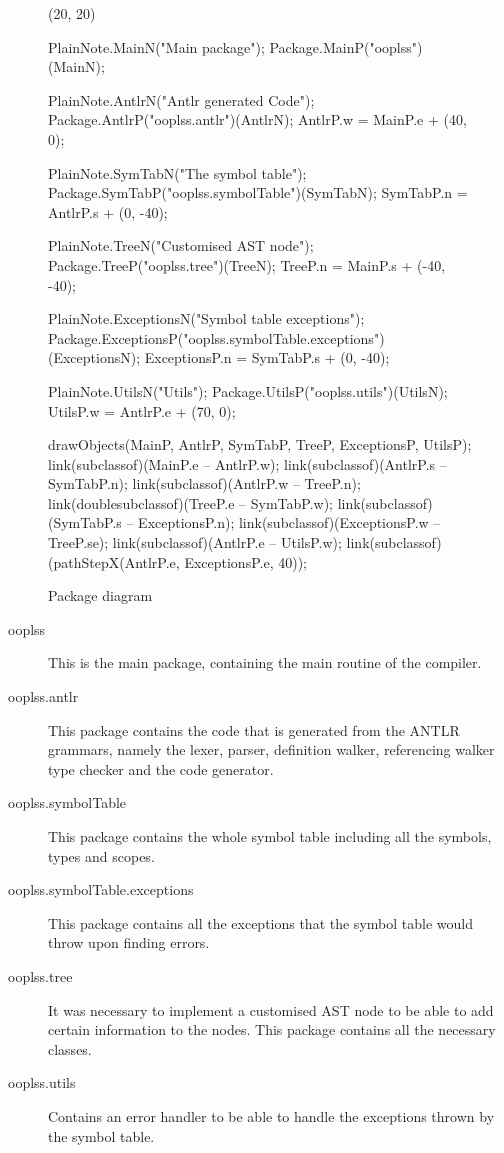 \begin{figure}[H]
\centering
	\begin{emp}[classdiag](20, 20)

	PlainNote.MainN("Main package");
	Package.MainP("ooplss")(MainN);

	PlainNote.AntlrN("Antlr generated Code");
	Package.AntlrP("ooplss.antlr")(AntlrN);
	AntlrP.w = MainP.e + (40, 0);

	PlainNote.SymTabN("The symbol table");
	Package.SymTabP("ooplss.symbolTable")(SymTabN);
	SymTabP.n = AntlrP.s + (0, -40);

	PlainNote.TreeN("Customised AST node");
	Package.TreeP("ooplss.tree")(TreeN);
	TreeP.n = MainP.s + (-40, -40);

	PlainNote.ExceptionsN("Symbol table exceptions");
	Package.ExceptionsP("ooplss.symbolTable.exceptions")(ExceptionsN);
	ExceptionsP.n = SymTabP.s + (0, -40);

	PlainNote.UtilsN("Utils");
	Package.UtilsP("ooplss.utils")(UtilsN);
	UtilsP.w = AntlrP.e + (70, 0);

	drawObjects(MainP, AntlrP, SymTabP, TreeP, ExceptionsP, UtilsP);
	link(subclassof)(MainP.e -- AntlrP.w);
	link(subclassof)(AntlrP.s -- SymTabP.n);
	link(subclassof)(AntlrP.w -- TreeP.n);
	link(doublesubclassof)(TreeP.e -- SymTabP.w);
	link(subclassof)(SymTabP.s -- ExceptionsP.n);
	link(subclassof)(ExceptionsP.w -- TreeP.se);
	link(subclassof)(AntlrP.e -- UtilsP.w);
	link(subclassof)(pathStepX(AntlrP.e, ExceptionsP.e, 40));

	\end{emp}
	\caption{Package diagram}
	\label{fig:packages}
\end{figure}


\begin{description}
\item[ooplss] This is the main package, containing the main routine of the
compiler.
\item[ooplss.antlr] This package contains the code that is generated from the
ANTLR grammars, namely the lexer, parser, definition walker, referencing walker
type checker and the code generator.
\item[ooplss.symbolTable] This package contains the whole symbol table including
all the symbols, types and scopes.
\item[ooplss.symbolTable.exceptions] This package contains all the exceptions
that the symbol table would throw upon finding errors.
\item[ooplss.tree] It was necessary to implement a customised AST node to be
able to add certain information to the nodes. This package contains all the
necessary classes.
\item[ooplss.utils] Contains an error handler to be able to handle the
exceptions thrown by the symbol table.
\end{description}

